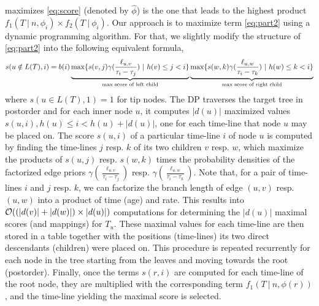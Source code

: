 \documentclass{llncs}
\begin{document}
maximizes \ref{eq:score} (denoted by $\hat\phi$) is the one that leads to the
highest product $f_1(T\ |\ n,\phi_i)\times f_2(T\ |\ \phi_i)$.%
Our approach is to maximize term \ref{eq:part2} using a dynamic programming
algorithm. For that, we slightly modify the structure of \ref{eq:part2} into
the following equivalent formula, 
%
%
\begin{equation}\label{eq:DP}
\begin{split}
s(u\notin L(T),i) = %
                    b(i)
                    \underbrace{
                        \max\{ s(v,j)\gamma(\frac{\ell_{u,v}}{\tau_i - \tau_j})\ |\ 
                          h(v) \leq j < i\}
                      }_{\textrm{max score of left child}}
                    \underbrace{
                        \max\{ s(w,k)\gamma(\frac{\ell_{u,w}}{\tau_i - \tau_k\vphantom{\tau_j}})\ |\ 
                          h(w) \leq k < i\}
                      }_{\textrm{max score of right child}}\\
\end{split}
\end{equation}
%
%
where $s(u\in L(T),1) = 1$ for tip nodes.%
%
The DP traverses the target tree in postorder and for each inner node $u$, it
computes $|d(u)|$ maximized values $s(u,i), h(u) \leq i < h(u) + |d(u)|$, one
for each time-line that node $u$ may be placed on.  The score $s(u,i)$ of a
particular time-line $i$ of node $u$ is computed by finding the time-lines $j$
resp. $k$ of its two children $v$ resp. $w$, which maximize the products of
$s(u,j)$ resp. $s(w,k)$ times the probability densities of the factorized edge
priors  $\gamma(\frac{\ell_{u,v}}{\tau_{i}-\tau_{j}})$ resp.
$\gamma(\frac{\ell_{u,w}}{\tau_{i}-\tau_{k}})$.
                    Note that, for a pair of time-lines $i$
and $j$ resp. $k$, we can factorize the branch length of edge $(u,v)$ resp.
$(u,w)$ into a product of time (age) and rate.
%
%
This results into ${\cal O}((|d(v)|+|d(w)|)\times|d(u)|)$ computations for
determining the $|d(u)|$ maximal scores (and mappings) for $T_u$. These maximal
values for each time-line are then stored in a table together with the
positions (time-lines) its two direct descendants (children) were placed on.
This procedure is repeated recurrently for each node in the tree starting from
the leaves and moving towards the root (postorder). Finally, once the terms
$s(r,i)$ are computed for each time-line of the root node, they are multiplied
with the corresponding term $f_1(T\ |\ n, \phi(r))$, and the time-line yielding
the maximal score is selected.
\end{document}
